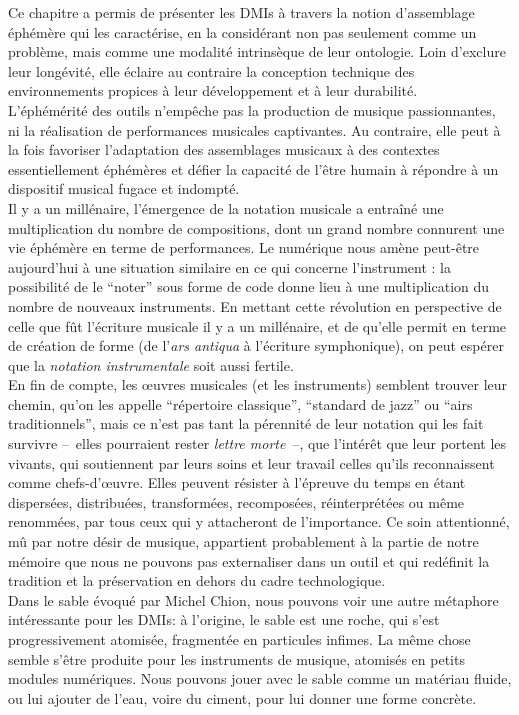 \noindent Ce chapitre a permis de présenter les \glspl{DMI} à travers la notion d'assemblage éphémère qui les caractérise, en la considérant non pas seulement comme un problème, mais comme une modalité intrinsèque de leur ontologie. Loin d'exclure leur longévité, elle éclaire au contraire la conception technique des environnements propices à leur développement et à leur durabilité.\\
\indent L'éphémérité des outils n'empêche pas la production de musique passionnantes, ni la réalisation de performances musicales captivantes. Au contraire, elle peut à la fois favoriser l'adaptation des assemblages musicaux à des contextes essentiellement éphémères et défier la capacité de l'être humain à répondre à un dispositif musical fugace et indompté.\\
\indent Il y a un millénaire, l'émergence de la notation musicale a entraîné une multiplication du nombre de compositions, dont un grand nombre connurent une vie éphémère en terme de performances. Le numérique nous amène peut-être aujourd'hui à une situation similaire en ce qui concerne l'instrument : la possibilité de le ``noter'' sous forme de code donne lieu à une multiplication du nombre de nouveaux instruments. En mettant cette révolution en perspective de celle que fût l'écriture musicale il y a un millénaire, et de qu'elle permit en terme de création de forme (de l'\textit{ars antiqua} à l'écriture symphonique), on peut espérer que la \textit{notation instrumentale} soit aussi fertile.\\
\indent En fin de compte, les œuvres musicales (et les instruments) semblent trouver leur chemin, qu'on les appelle ``répertoire classique'', ``standard de jazz'' ou ``airs traditionnels'', mais ce n'est pas tant la pérennité de leur notation qui les fait survivre --~elles pourraient rester \textit{lettre morte}~--, que l'intérêt que leur portent les vivants, qui soutiennent par leurs soins et leur travail celles qu'ils reconnaissent comme chefs-d'œuvre. Elles peuvent résister à l'épreuve du temps en étant dispersées, distribuées, transformées, recomposées, réinterprétées ou même renommées, par tous ceux qui y attacheront de l'importance. Ce soin attentionné, mû par notre désir de musique, appartient probablement à la partie de notre mémoire que nous ne pouvons pas externaliser dans un outil et qui redéfinit la tradition et la préservation en dehors du cadre technologique.\\
\indent Dans le sable évoqué par Michel Chion, nous pouvons voir une autre métaphore intéressante pour les \glspl{DMI}: à l'origine, le sable est une roche, qui s'est progressivement atomisée, fragmentée en particules infimes. La même chose semble s'être produite pour les instruments de musique, atomisés en petits modules numériques. Nous pouvons jouer avec le sable comme un matériau fluide, ou lui ajouter de l'eau, voire du ciment, pour lui donner une forme concrète.\\
